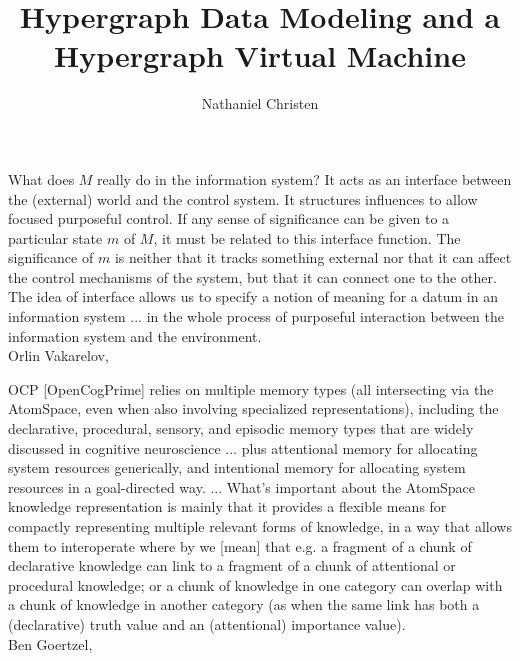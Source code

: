 \documentclass[11pt,twocolumn]{article}
\begin{document}
\title{Hypergraph Data Modeling and a Hypergraph Virtual Machine}
\author{Nathaniel Christen}
\newsavebox{\qboxi}
\newsavebox{\qboxii}
\newsavebox{\qboxiii}
\begin{lrbox}{\qboxi}
\begin{frquote}What does $M$ really do in the information system?  It acts as
an interface between the (external) world and the control 
system.  It structures influences to allow focused purposeful
control.  If any sense of significance can be given
to a particular state $m$ of $M$, it must be related
to this interface function.  The
significance of $m$ is neither that it
tracks something external nor
that it can affect the
control mechanisms of the system,
but that it can connect one to the
other.  The idea of interface allows
us to specify a notion of meaning for a datum
in an information system ... in the whole process
of purposeful interaction between the information system and the environment.
\\ \longdash{} Orlin Vakarelov, \cite[p. 15-16]{OrlinVakarelov}{}
\end{frquote}
\end{lrbox}	
\begin{lrbox}{\qboxii}
\begin{frquote}OCP [OpenCogPrime] relies on multiple memory types 
(all intersecting via the AtomSpace, even when also involving 
specialized representations), including the declarative, procedural, sensory, 
and episodic memory types that are widely discussed in cognitive 
neuroscience ... plus attentional memory for allocating system resources
generically, and intentional memory for allocating system resources in 
a goal-directed way.  ...
What's important about the AtomSpace knowledge representation is mainly 
that it provides a flexible means for compactly representing multiple relevant forms 
of knowledge, in a way that allows them to interoperate \mdash{} 
where by  we [mean] that e.g. a 
fragment of a chunk of declarative knowledge can link
to a fragment of a chunk of attentional or procedural knowledge; 
or a chunk of knowledge in one category
can overlap with a chunk of knowledge in another category (as when the same link has both a (declarative) truth value and an 
(attentional) importance value).  
\\ \longdash{} Ben Goertzel, \cite[pp. 4-5]{GoertzelSS}{}
\end{frquote}
\end{lrbox}	
\end{document}
